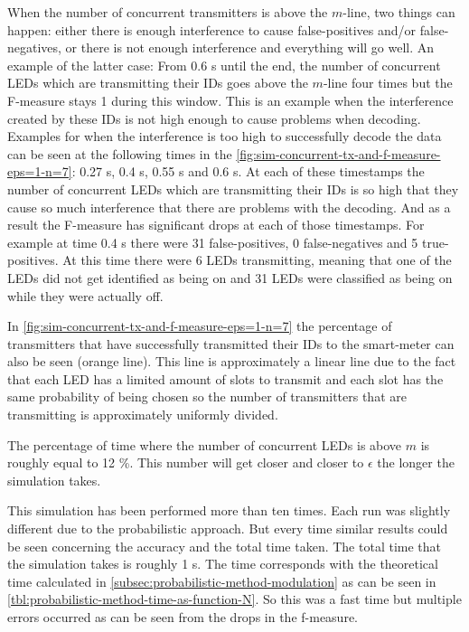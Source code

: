 When the number of concurrent transmitters is above the $m$-line, two things can happen: either there is enough interference to cause false-positives and/or false-negatives, or there is not enough interference and everything will go well.
An example of the latter case: From 0.6 s until the end, the number of concurrent LEDs which are transmitting their IDs goes above the $m$-line four times but the F-measure stays 1 during this window.
This is an example when the interference created by these IDs is not high enough to cause problems when decoding.
Examples for when the interference is too high to successfully decode the data can be seen at the following times in the \autoref{fig:sim-concurrent-tx-and-f-measure-eps=1-n=7}: 0.27 s, 0.4 s, 0.55 s and 0.6 s.
At each of these timestamps the number of concurrent LEDs which are transmitting their IDs is so high that they cause so much interference that there are problems with the decoding.
And as a result the F-measure has significant drops at each of those timestamps.
For example at time 0.4 s there were 31 false-positives, 0 false-negatives and 5 true-positives.
At this time there were 6 LEDs transmitting, meaning that one of the LEDs did not get identified as being on and 31 LEDs were classified as being on while they were actually off.



In \autoref{fig:sim-concurrent-tx-and-f-measure-eps=1-n=7} the percentage of transmitters that have successfully transmitted their IDs to the smart-meter can also be seen (orange line).
This line is approximately a linear line due to the fact that each LED has a limited amount of slots to transmit and each slot has the same probability of being chosen so the number of transmitters that are transmitting is approximately uniformly divided.


The percentage of time where the number of concurrent LEDs is above $m$ is roughly equal to 12 \%.
This number will get closer and closer to $\epsilon$ the longer the simulation takes.


This simulation has been performed more than ten times.
Each run was slightly different due to the probabilistic approach.
But every time similar results could be seen concerning the accuracy and the total time taken.
The total time that the simulation takes is roughly 1 s.
The time corresponds with the theoretical time calculated in \autoref{subsec:probabilistic-method-modulation} as can be seen in \autoref{tbl:probabilistic-method-time-as-function-N}.
So this was a fast time but multiple errors occurred as can be seen from the drops in the f-measure.



